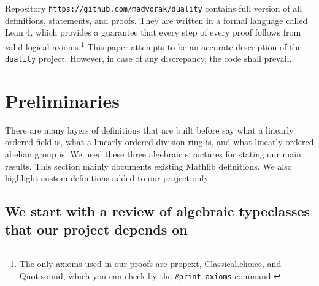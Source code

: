 \documentclass[]{article}
\renewcommand{\.}{\hskip .75pt}
\begin{document}
Repository \texttt{https://github.com/madvorak/duality}
contains full version of all definitions, statements,
and proofs. They are written in a formal language called
Lean 4, which provides a guarantee that every step of
every proof follows from valid logical axioms.\footnote{
The only axioms used in our proofs are
propext, Classical.choice, and Quot.sound, which you can
check by the \texttt{\#print axioms} command.}
This paper attempts to be an accurate description of
the \texttt{duality} project.
However, in case of any discrepancy, the code shall prevail.

\section{Preliminaries}
\label{preliminaries}

There are many layers of definitions that are built before say what
a linearly ordered field is, what a linearly ordered division ring is,
and what linearly ordered abelian group is.
We need these three algebraic structures for stating our main results.
This section mainly documents existing Mathlib definitions.
We also highlight custom definitions added to our project only.

\subsection{We start with a review of algebraic typeclasses that our project depends on}
\end{document}
